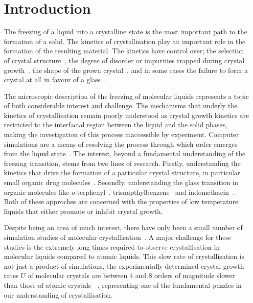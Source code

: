 \chapter {Introduction}
\label{sec:introduction}

The freezing of a liquid into a crystalline state is the most important path to the formation of a solid. The kinetics of crystallisation play an important role in the formation of the resulting material. The kinetics have control over; the selection of crystal structure~\cite{de-yoreo:03,lofton:05}, the degree of disorder or impurities trapped during crystal growth~\cite{chernov:77,malkin:99}, the shape of the grown crystal~\cite{bakar:09}, and in some cases the failure to form a crystal at all in favour of a glass~\cite{turnbull:69,uhlmann:72,debenedetti:01}.

The microscopic description of the freezing of molecular liquids represents a topic of both considerable interest and challenge. The mechanisms that underly the kinetics of crystallisation remain poorly understood as crystal growth kinetics are restricted to the interfacial region between the liquid and the solid phases, making the investigation of this process inaccessible by experiment. Computer simulations are a means of resolving the process through which order emerges from the liquid state~\cite{jackson:02,svishchev:94,tenwolde:96}. The interest, beyond a fundamental understanding of the freezing transition, stems from two lines of research. Firstly, understanding the kinetics that drive the formation of a particular crystal structure, in particular small organic drug molecules~\cite{childs:04}. Secondly, understanding the glass transition in organic molecules like \emph{o}-terphenyl~\cite{greet:67}, trisnapthylbenzene~\cite{swallen:03} and indomethacin~\cite{hancock:00}. Both of these approches are concerned with the properties of low temperature liquids that either promote or inhibit crystal growth.

Despite being an area of much interest, there have only been a small number of simulation studies of molecular crystallisation~\cite{affouard:99,kammerer:97,moreno:05}. A major challenge for these studies is the extremely long times required to observe crystallisation in molecular liquids compared to atomic liquids. This slow rate of crystallisation is not just a product of simulations, the experimentally determined crystal growth rates $U$ of molecular crystals are between 4 and 8 orders of magnitude slower than those of atomic crystals~~\cite{orava:14}, representing one of the fundamental puzzles in our understanding of crystallisation.

